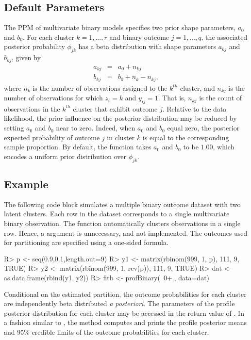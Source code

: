 \documentclass[article, nojss]{jss}
\begin{document}
\subsection[Defaults]{Default Parameters}
The PPM of multivariate binary models specifies two prior shape parameters, $a_0$ and $b_0$. For each cluster $k = 1, \ldots, r$ and binary outcome $j = 1, \ldots, q$, the associated posterior probability $\phi_{jk}$ has a beta distribution with shape parameters $a_{kj}$ and $b_{kj}$, given by
\begin{eqnarray}
a_{kj} &=& a_0 + n_{kj} \nonumber \\
b_{kj} &=& b_0 + n_k - n_{kj},
\end{eqnarray} 
where $n_k$ is the number of observations assigned to the $k^{th}$ cluster, and $n_{kj}$ is the number of observations for which $z_i = k$ and $y_{ij} = 1$. That is, $n_{kj}$ is the count of observations in the $k^{th}$ cluster that exhibit outcome $j$. Relative to the data likelihood, the prior influence on the posterior distribution may be reduced by setting $a_0$ and $b_0$ near to zero. Indeed, when $a_0$ and $b_0$ equal zero, the posterior expected probability of outcome $j$ in cluster $k$ is equal to the corresponding sample proportion. By default, the  function takes $a_0$ and $b_0$ to be $1.00$, which encodes a uniform prior distribution over $\phi_{jk}$.

\subsection[Example]{ Example}
The following  code block simulates a multiple binary outcome dataset with two latent clusters. Each row in the dataset corresponds to a single multivariate binary observation. The  function automatically clusters observations in a single row. Hence, a  argument is unnecessary, and not implemented. The outcomes used for partitioning are specified using a one-sided formula.
\begin{Schunk}
\begin{Sinput}
R> p <- seq(0.9,0.1,length.out=9)
R> y1 <- matrix(rbinom(999, 1, p), 111, 9, TRUE)
R> y2 <- matrix(rbinom(999, 1, rev(p)), 111, 9, TRUE)
R> dat <- as.data.frame(rbind(y1, y2))
R> fitb <- profBinary(~0+., data=dat)
\end{Sinput}
\end{Schunk}

Conditional on the estimated partition, the outcome probabilities for each cluster are independently beta distributed {\it a posteriori}. The parameters of the profile posterior distribution for each cluster may be accessed in the return value of . In a fashion similar to , the  method computes and prints the profile posterior means and 95\% credible limits of the outcome probabilities for each cluster.
\end{document}
